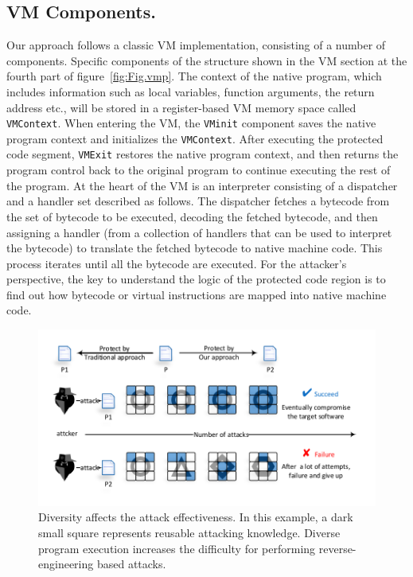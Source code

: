 \subsection{VM Components.} Our approach follows a classic VM implementation,
consisting of a number of components. 
Specific components of the structure shown in the VM section at the fourth part of figure~\ref{fig:Fig.vmp}. 
The context of the native program, which includes
information such as local variables, function arguments, the return address etc.,
will be stored in a register-based VM memory space called \texttt{VMContext}. When entering the VM, the \texttt{VMinit}
component saves the native program context and initializes the
\texttt{VMContext}. After executing the protected code segment,  \texttt{VMExit} restores the
native program context, and then returns the program control back to the
original program to continue executing the rest of the program.
At the heart of the VM is an interpreter consisting of a
dispatcher and a handler set described as follows. The dispatcher fetches a
bytecode from the set of bytecode to be executed, decoding the fetched
bytecode, and then assigning a handler (from a collection of handlers that can be used
to interpret the bytecode)  to translate the fetched bytecode to native
machine code. This process iterates until all the bytecode are executed.
For the attacker's perspective, the key to understand the
logic of the protected code region is to find out how
bytecode or virtual instructions are mapped into native machine code.

\begin{figure}[t]%
    \centering
    \includegraphics[width=0.7\columnwidth]{figure/figattack.pdf}
    \caption{Diversity affects the attack effectiveness. In this example, a dark small square represents reusable attacking knowledge. Diverse program execution increases the difficulty for performing reverse-engineering based attacks.}\label{fig:Fig.attack}
\end{figure}


